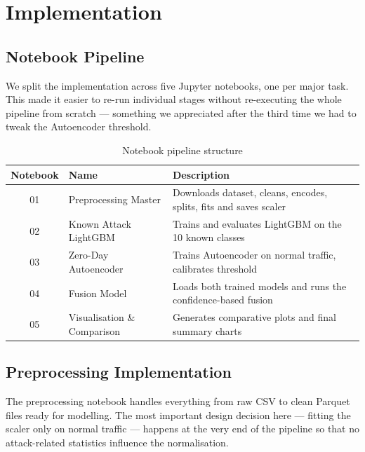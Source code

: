 \documentclass[12pt,a4paper]{report}
\begin{document}
\chapter{Implementation}

\section{Notebook Pipeline}

We split the implementation across five Jupyter notebooks, one per major task.
This made it easier to re-run individual stages without re-executing the whole
pipeline from scratch — something we appreciated after the third time we had
to tweak the Autoencoder threshold.

\begin{table}[H]
\centering
\caption{Notebook pipeline structure}
\label{tab:notebooks}
\begin{tabular}{clp{8cm}}
\toprule
\textbf{Notebook} & \textbf{Name} & \textbf{Description} \\
\midrule
01 & Preprocessing Master       & Downloads dataset, cleans, encodes, splits, fits and saves scaler \\
02 & Known Attack LightGBM      & Trains and evaluates LightGBM on the 10 known classes \\
03 & Zero-Day Autoencoder       & Trains Autoencoder on normal traffic, calibrates threshold \\
04 & Fusion Model               & Loads both trained models and runs the confidence-based fusion \\
05 & Visualisation \& Comparison & Generates comparative plots and final summary charts \\
\bottomrule
\end{tabular}
\end{table}

\section{Preprocessing Implementation}

The preprocessing notebook handles everything from raw CSV to clean Parquet
files ready for modelling. The most important design decision here — fitting the
scaler only on normal traffic — happens at the very end of the pipeline so that
no attack-related statistics influence the normalisation.
\end{document}
